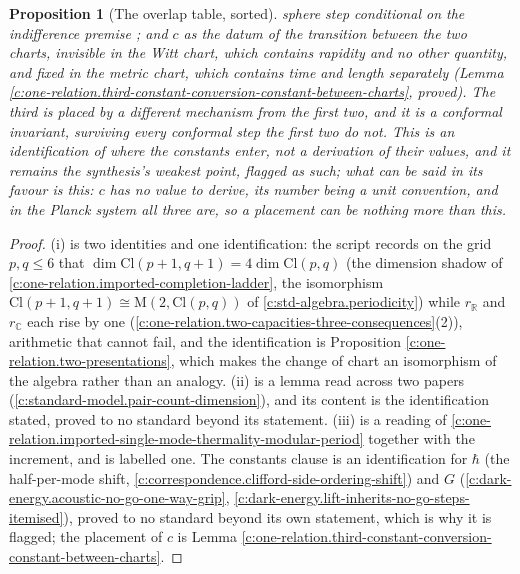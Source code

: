 \documentclass[11pt]{article}
\newtheorem{proposition}[theorem]{Proposition}
\theoremstyle{definition}
\theoremstyle{plain}
\providecommand{\C}{}\renewcommand{\C}{\mathbb{C}}
\providecommand{\Cl}{}\renewcommand{\Cl}{\mathrm{Cl}}
\providecommand{\Mat}{}\renewcommand{\Mat}{\mathrm{M}}
\providecommand{\R}{}\renewcommand{\R}{\mathbb{R}}
\begin{document}
\begin{proposition}[The overlap table, sorted]
sphere step conditional on the indifference premise \cite[Prop.~5.2, Rem.~5.3, Assembly~5.5]{ButlerT10}; and $c$ as the datum of the transition between the two charts, invisible in the Witt chart, which contains rapidity and no other quantity, and fixed in the metric chart, which contains time and length separately (Lemma \ref{c:one-relation.third-constant-conversion-constant-between-charts}, proved). The third is placed by a different mechanism from the first two, and it is a conformal invariant, surviving every conformal step the first two do not. This is an identification of \emph{where} the constants enter, not a derivation of their values, and it remains the synthesis's weakest point, flagged as such; what can be said in its favour is this: $c$ has no value to derive, its number being a unit convention, and in the Planck system all three are, so a placement can be nothing more than this.
\end{proposition}
\begin{proof}
(i) is two identities and one identification: the script records on the grid $p, q \leq 6$ that $\dim \Cl(p+1,q+1) = 4\dim\Cl(p,q)$ (the dimension shadow of \ref{c:one-relation.imported-completion-ladder}, the isomorphism $\Cl(p+1,q+1) \cong \Mat(2, \Cl(p,q))$ of \ref{c:std-algebra.periodicity}) while $r_{\R}$ and $r_{\C}$ each rise by one (\ref{c:one-relation.two-capacities-three-consequences}(2)), arithmetic that cannot fail, and the identification is Proposition \ref{c:one-relation.two-presentations}, which makes the change of chart an isomorphism of the algebra rather than an analogy. (ii) is a lemma read across two papers (\ref{c:standard-model.pair-count-dimension}), and its content is the identification stated, proved to no standard beyond its statement. (iii) is a reading of \ref{c:one-relation.imported-single-mode-thermality-modular-period} together with the increment, and is labelled one. The constants clause is an identification for $\hbar$ (the half-per-mode shift, \ref{c:correspondence.clifford-side-ordering-shift}) and $G$ (\ref{c:dark-energy.acoustic-no-go-one-way-grip}, \ref{c:dark-energy.lift-inherits-no-go-steps-itemised}), proved to no standard beyond its own statement, which is why it is flagged; the placement of $c$ is Lemma \ref{c:one-relation.third-constant-conversion-constant-between-charts}.

\end{proof}
\end{document}
